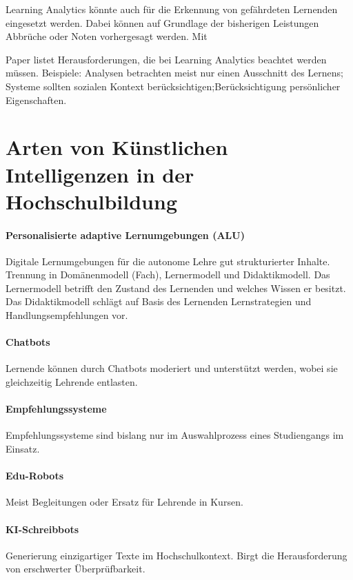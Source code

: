 Learning Analytics könnte auch für die Erkennung von gefährdeten Lernenden eingesetzt werden. Dabei können auf Grundlage der bisherigen Leistungen Abbrüche oder Noten vorhergesagt werden. Mit

Paper listet Herausforderungen, die bei Learning Analytics beachtet werden müssen. Beispiele: Analysen betrachten meist nur einen Ausschnitt des Lernens; Systeme sollten sozialen Kontext berücksichtigen;Berücksichtigung persönlicher Eigenschaften.

\section*{Arten von Künstlichen Intelligenzen in der Hochschulbildung}

\paragraph*{Personalisierte adaptive Lernumgebungen (ALU)}
Digitale Lernumgebungen für die autonome Lehre gut strukturierter Inhalte. Trennung in Domänenmodell (Fach), Lernermodell und Didaktikmodell. Das Lernermodell betrifft den Zustand des Lernenden und welches Wissen er besitzt. Das Didaktikmodell schlägt auf Basis des Lernenden Lernstrategien und Handlungsempfehlungen vor.

\paragraph*{Chatbots}
Lernende können durch Chatbots moderiert und unterstützt werden, wobei sie gleichzeitig Lehrende entlasten.

\paragraph*{Empfehlungssysteme}
Empfehlungssysteme sind bislang nur im Auswahlprozess eines Studiengangs im Einsatz.

\paragraph*{Edu-Robots}
Meist Begleitungen oder Ersatz für Lehrende in Kursen.

\paragraph*{KI-Schreibbots}
Generierung einzigartiger Texte im Hochschulkontext. Birgt die Herausforderung von erschwerter Überprüfbarkeit.

